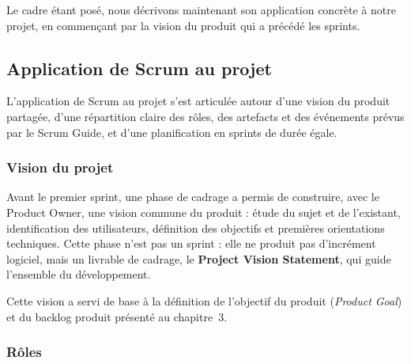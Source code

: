 Le cadre étant posé, nous décrivons maintenant son application concrète à notre projet, en commençant par la vision du produit qui a précédé les sprints.

\subsection{Application de Scrum au projet}

L'application de Scrum au projet s'est articulée autour d'une vision du produit partagée, d'une répartition claire des rôles, des artefacts et des événements prévus par le Scrum Guide, et d'une planification en sprints de durée égale.

\subsubsection{Vision du projet}

Avant le premier sprint, une phase de cadrage a permis de construire, avec le Product Owner, une vision commune du produit : étude du sujet et de l'existant, identification des utilisateurs, définition des objectifs et premières orientations techniques. Cette phase n'est pas un sprint : elle ne produit pas d'incrément logiciel, mais un livrable de cadrage, le \textbf{Project Vision Statement}, qui guide l'ensemble du développement.


Cette vision a servi de base à la définition de l'objectif du produit (\textit{Product Goal}) et du backlog produit présenté au chapitre~3.

\subsubsection{Rôles}

